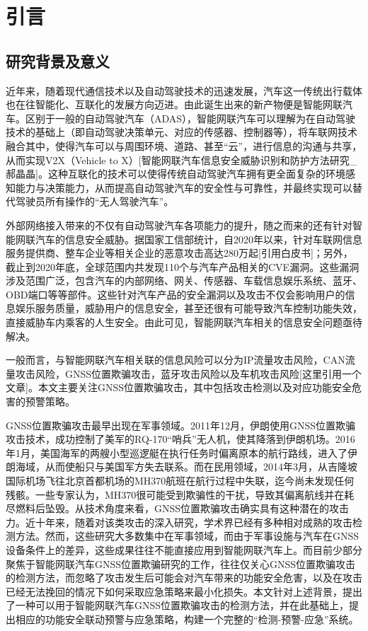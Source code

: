 \section{引言}

\subsection{研究背景及意义}
近年来，随着现代通信技术以及自动驾驶技术的迅速发展，汽车这一传统出行载体也在往智能化、互联化的发展方向迈进。由此诞生出来的新产物便是智能网联汽车。区别于一般的自动驾驶汽车（ADAS），智能网联汽车可以理解为在自动驾驶技术的基础上（即自动驾驶决策单元、对应的传感器、控制器等），将车联网技术融合其中，使得汽车可以与周围环境、道路、甚至“云”，进行信息的沟通与共享，从而实现V2X（Vehicle to X）[智能网联汽车信息安全威胁识别和防护方法研究\_郝晶晶]。这种互联化的技术可以使得传统自动驾驶汽车拥有更全面复杂的环境感知能力与决策能力，从而提高自动驾驶汽车的安全性与可靠性，并最终实现可以替代驾驶员所有操作的“无人驾驶汽车”。

外部网络接入带来的不仅有自动驾驶汽车各项能力的提升，随之而来的还有针对智能网联汽车的信息安全威胁。据国家工信部统计，自2020年以来，针对车联网信息服务提供商、整车企业等相关企业的恶意攻击高达280万起[引用白皮书]；另外，截止到2020年底，全球范围内共发现110个与汽车产品相关的CVE漏洞。这些漏洞涉及范围广泛，包含汽车的内部网络、网关、传感器、车载信息娱乐系统、蓝牙、OBD端口等等部件。这些针对汽车产品的安全漏洞以及攻击不仅会影响用户的信息娱乐服务质量，威胁用户的信息安全，甚至还很有可能导致汽车控制功能失效，直接威胁车内乘客的人生安全。由此可见，智能网联汽车相关的信息安全问题亟待解决。

一般而言，与智能网联汽车相关联的信息风险可以分为IP流量攻击风险，CAN流量攻击风险，GNSS位置欺骗攻击，蓝牙攻击风险以及车机攻击风险[这里引用一个文章]。本文主要关注GNSS位置欺骗攻击，其中包括攻击检测以及对应功能安全危害的预警策略。

GNSS位置欺骗攻击最早出现在军事领域。2011年12月，伊朗使用GNSS位置欺骗攻击技术，成功控制了美军的RQ-170“哨兵”无人机，使其降落到伊朗机场。2016年1月，美国海军的两艘小型巡逻艇在执行任务时偏离原本的航行路线，进入了伊朗海域，从而使船只与美国军方失去联系。而在民用领域，2014年3月，从吉隆坡国际机场飞往北京首都机场的MH370航班在航行过程中失联，迄今尚未发现任何残骸。一些专家认为，MH370很可能受到欺骗性的干扰，导致其偏离航线并在耗尽燃料后坠毁。从技术角度来看，GNSS位置欺骗攻击确实具有这种潜在的攻击力。近十年来，随着对该类攻击的深入研究，学术界已经有多种相对成熟的攻击检测方法。然而，这些研究大多数集中在军事领域，而由于军事设施与汽车在GNSS设备条件上的差异，这些成果往往不能直接应用到智能网联汽车上。而目前少部分聚焦于智能网联汽车GNSS位置欺骗研究的工作，往往仅关心GNSS位置欺骗攻击的检测方法，而忽略了攻击发生后可能会对汽车带来的功能安全危害，以及在攻击已经无法挽回的情况下如何采取应急策略来最小化损失。本文针对上述背景，提出了一种可以用于智能网联汽车GNSS位置欺骗攻击的检测方法，并在此基础上，提出相应的功能安全联动预警与应急策略，构建一个完整的“检测-预警-应急”系统。

